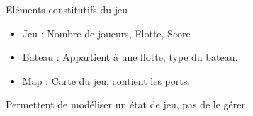 \begin{frame}
\begin{block}{Eléments constitutifs du jeu}
  \begin{itemize}
  \item Jeu : Nombre de joueurs, Flotte, Score
  \item Bateau : Appartient à une flotte, type du bateau.
  \item Map : Carte du jeu, contient les ports.
  \end{itemize}
Permettent de modéliser un état de jeu, pas de le gérer.
  
\end{block}
\end{frame}